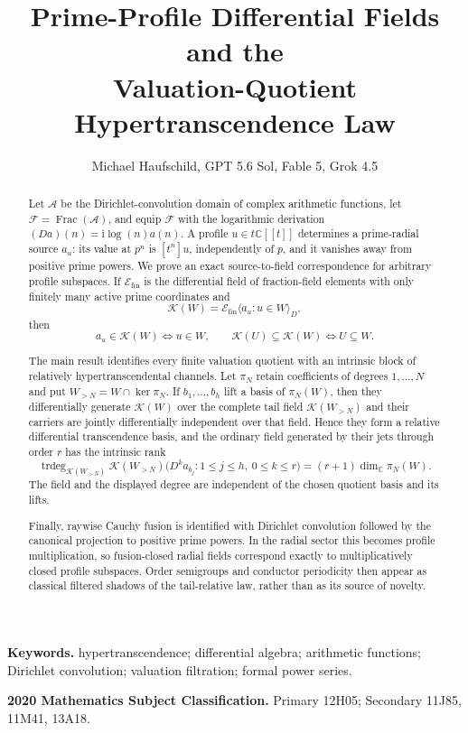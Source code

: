 \documentclass[11pt]{article}
\title{Prime-Profile Differential Fields and the\\
Valuation-Quotient Hypertranscendence Law}
\author{Michael Haufschild, GPT 5.6 Sol, Fable 5, Grok 4.5}
\date{}
\theoremstyle{definition}
\theoremstyle{remark}
\newcommand{\C}{\mathbb C}
\newcommand{\A}{\mathcal A}
\newcommand{\F}{\mathcal F}
\newcommand{\Efin}{\mathcal E_{\mathrm{fin}}}
\newcommand{\K}{\mathcal K}
\newcommand{\Frac}{\operatorname{Frac}}
\newcommand{\trdeg}{\operatorname{trdeg}}
\begin{document}
\maketitle

\begin{abstract}
Let $\A$ be the Dirichlet-convolution domain of complex arithmetic functions, let
$\F=\Frac(\A)$, and equip $\F$ with the logarithmic derivation
$(Da)(n)=\mathrm i\log(n)a(n)$.  A profile $u\in t\C[[t]]$ determines a prime-radial source
$a_u$: its value at $p^n$ is $[t^n]u$, independently of $p$, and it vanishes away from positive
prime powers.  We prove an exact source-to-field correspondence for arbitrary profile subspaces.
If $\Efin$ is the differential field of fraction-field elements with only finitely many active
prime coordinates and
\[
  \K(W)=\Efin\langle a_u:u\in W\rangle_D,
\]
then
\[
  a_u\in\K(W)\Longleftrightarrow u\in W,
  \qquad
  \K(U)\subseteq\K(W)\Longleftrightarrow U\subseteq W.
\]

The main result identifies every finite valuation quotient with an intrinsic block of relatively
hypertranscendental channels.  Let $\pi_N$ retain coefficients of degrees $1,\ldots,N$ and put
$W_{>N}=W\cap\ker\pi_N$.  If $b_1,\ldots,b_h$ lift a basis of $\pi_N(W)$, then they
differentially generate $\K(W)$ over the complete tail field $\K(W_{>N})$ and their carriers are
jointly differentially independent over that field.  Hence they form a relative differential
transcendence basis, and the ordinary field generated by their jets through order $r$ has the
intrinsic rank
\[
 \trdeg_{\K(W_{>N})}
 \K(W_{>N})\bigl(D^ka_{b_j}:1\le j\le h,\ 0\le k\le r\bigr)
   =(r+1)\dim_\C\pi_N(W).
\]
The field and the displayed degree are independent of the chosen quotient basis and its lifts.

Finally, raywise Cauchy fusion is identified with Dirichlet convolution followed by the canonical
projection to positive prime powers.  In the radial sector this becomes profile multiplication,
so fusion-closed radial fields correspond exactly to multiplicatively closed profile subspaces.
Order semigroups and conductor periodicity then appear as classical filtered shadows of the
tail-relative law, rather than as its source of novelty.
\end{abstract}

\medskip
\noindent\textbf{Keywords.}
hypertranscendence; differential algebra; arithmetic functions; Dirichlet convolution;
valuation filtration; formal power series.

\medskip
\noindent\textbf{2020 Mathematics Subject Classification.} Primary 12H05; Secondary 11J85,
11M41, 13A18.
\end{document}

